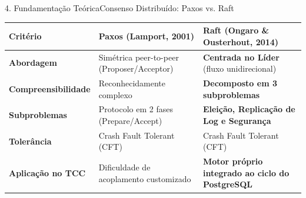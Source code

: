 \documentclass[aspectratio=169,10pt]{beamer}
\begin{document}
\begin{frame}{4. Fundamentação Teórica}{Consenso Distribuído: Paxos vs. Raft}
  \begin{table}
    \small
    \centering
    \begin{tabular}{p{2.6cm} p{5.0cm} p{5.0cm}}
      \toprule
      \textbf{Critério} & \textbf{Paxos (Lamport, 2001)} & \textbf{Raft (Ongaro \& Ousterhout, 2014)} \\
      \midrule
      \textbf{Abordagem} & Simétrica peer-to-peer (Proposer/Acceptor) & \textbf{Centrada no Líder} (fluxo unidirecional) \\
      \textbf{Compreensibilidade} & Reconhecidamente complexo & \textbf{Decomposto em 3 subproblemas} \\
      \textbf{Subproblemas} & Protocolo em 2 fases (Prepare/Accept) & \textbf{Eleição, Replicação de Log e Segurança} \\
      \textbf{Tolerância} & Crash Fault Tolerant (CFT) & Crash Fault Tolerant (CFT) \\
      \textbf{Aplicação no TCC} & Dificuldade de acoplamento customizado & \textbf{Motor próprio integrado ao ciclo do PostgreSQL} \\
      \bottomrule
    \end{tabular}
  \end{table}
\end{frame}
\end{document}

